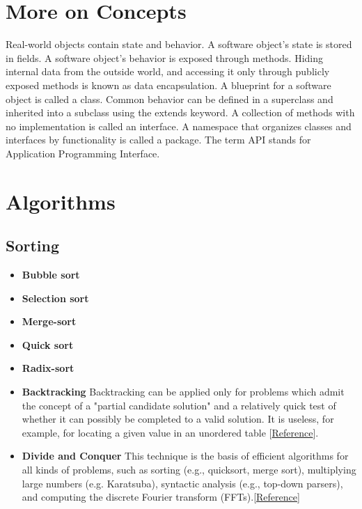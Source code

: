 \documentclass[letterpaper]{article}
\begin{document}
\section{More on Concepts}
Real-world objects contain state and behavior.
A software object's state is stored in fields.
A software object's behavior is exposed through methods.
Hiding internal data from the outside world, and accessing it only through publicly exposed methods is known as data encapsulation.
A blueprint for a software object is called a class.
Common behavior can be defined in a superclass and inherited into a subclass using the extends keyword.
A collection of methods with no implementation is called an interface.
A namespace that organizes classes and interfaces by functionality is called a package.
The term API stands for Application Programming Interface.

\section{Algorithms}

\subsection{Sorting}
\begin{itemize}
\item{\bf Bubble sort}
\item{\bf Selection sort}
\item{\bf Merge-sort} 

\item{\bf Quick sort}
\item{\bf Radix-sort}
\item{\bf Backtracking } Backtracking can be applied only for problems which admit the concept of a "partial candidate solution" and a relatively quick test of whether it can possibly be completed to a valid solution. It is useless, for example, for locating a given value in an unordered table [\href{http://en.wikipedia.org/wiki/Backtracking}{Reference}]. 
\item{\bf Divide and Conquer} This technique is the basis of efficient algorithms for all kinds of problems, such as sorting (e.g., quicksort, merge sort), multiplying large numbers (e.g. Karatsuba), syntactic analysis (e.g., top-down parsers), and computing the discrete Fourier transform (FFTs).[\href{http://en.wikipedia.org/wiki/Divide_and_conquer_algorithm}{Reference}]

\end{itemize}
\end{document}

